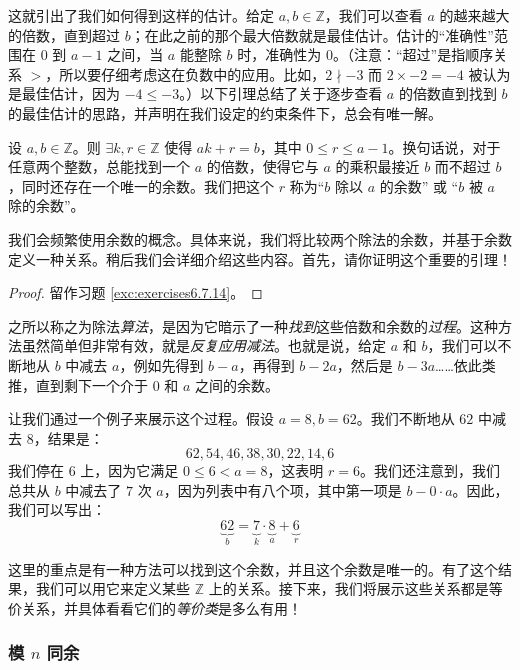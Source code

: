 这就引出了我们如何得到这样的估计。给定 $a, b \in \mathbb{Z}$，我们可以查看 $a$ 的越来越大的倍数，直到超过 $b$；在此之前的那个最大倍数就是最佳估计。估计的``准确性''范围在 $0$ 到 $a - 1$ 之间，当 $a$ 能整除 $b$ 时，准确性为 $0$。（注意：``超过''是指顺序关系 $>$，所以要仔细考虑这在负数中的应用。比如，$2 \nmid -3$ 而 $2 \times -2 = -4$ 被认为是最佳估计，因为 $-4 \le -3$。）以下引理总结了关于逐步查看 $a$ 的倍数直到找到 $b$ 的最佳估计的思路，并声明在我们设定的约束条件下，总会有唯一解。

\begin{lemma}[除法算法]\label{lemma6.5.2}
    设 $a,b \in \mathbb{Z}$。则 $\exists k, r \in \mathbb{Z}$ 使得 $ak + r = b$，其中 $0 \le r \le a - 1$。换句话说，对于任意两个整数，总能找到一个 $a$ 的倍数，使得它与 $a$ 的乘积最接近 $b$ 而不超过 $b$，同时还存在一个唯一的余数。我们把这个 $r$ 称为``$b$ 除以 $a$ 的余数'' 或 ``$b$ 被 $a$ 除的余数''。
\end{lemma}

我们会频繁使用余数的概念。具体来说，我们将比较两个除法的余数，并基于余数定义一种关系。稍后我们会详细介绍这些内容。首先，请你证明这个重要的引理！

\begin{proof}
    留作习题 \ref{exc:exercises6.7.14}。
\end{proof}

之所以称之为除法\emph{算法}，是因为它暗示了一种\emph{找到}这些倍数和余数的\emph{过程}。这种方法虽然简单但非常有效，就是\emph{反复应用减法}。也就是说，给定 $a$ 和 $b$，我们可以不断地从 $b$ 中减去 $a$，例如先得到 $b - a$，再得到 $b - 2a$，然后是 $b - 3a$……依此类推，直到剩下一个介于 $0$ 和 $a$ 之间的余数。\\

\begin{example}
    让我们通过一个例子来展示这个过程。假设 $a = 8, b = 62$。我们不断地从 $62$ 中减去 $8$，结果是：
    \[62, 54, 46, 38, 30, 22, 14, 6\]
    我们停在 $6$ 上，因为它满足 $0 \le 6 < a = 8$，这表明 $r = 6$。我们还注意到，我们总共从 $b$ 中减去了 $7$ 次 $a$，因为列表中有八个项，其中第一项是 $b - 0 \cdot a$。因此，我们可以写出：
    \[\underbrace{62}_{b} = \underbrace{7}_{k} \cdot \underbrace{8}_{a} + \underbrace{6}_{r}\]
\end{example}

这里的重点是有一种方法可以找到这个余数，并且这个余数是唯一的。有了这个结果，我们可以用它来定义某些 $\mathbb{Z}$ 上的关系。接下来，我们将展示这些关系都是等价关系，并具体看看它们的\emph{等价类}是多么有用！

\subsubsection*{模 $n$ 同余}

